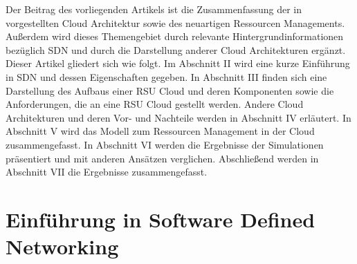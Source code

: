 \documentclass[conference]{IEEEtran}
\begin{document}
Der Beitrag des vorliegenden Artikels ist die Zusammenfassung der in \cite{IEEEhowto:orig} vorgestellten Cloud Architektur sowie des neuartigen Ressourcen Managements. Außerdem wird dieses Themengebiet durch relevante Hintergrundinformationen bezüglich SDN und durch die Darstellung anderer Cloud Architekturen ergänzt.\\
Dieser Artikel gliedert sich wie folgt. Im Abschnitt II wird eine kurze Einführung in SDN und dessen Eigenschaften gegeben. In Abschnitt III finden sich eine Darstellung des Aufbaus einer RSU Cloud und deren Komponenten sowie die Anforderungen, die an eine RSU Cloud gestellt werden. Andere Cloud Architekturen und deren Vor- und Nachteile werden in Abschnitt IV erläutert. In Abschnitt V wird das Modell zum Ressourcen Management in der Cloud zusammengefasst. In Abschnitt VI werden die Ergebnisse der Simulationen präsentiert und mit anderen Ansätzen verglichen. Abschließend werden in Abschnitt VII die Ergebnisse zusammengefasst.



\section{Einführung in Software Defined Networking}
\end{document}
